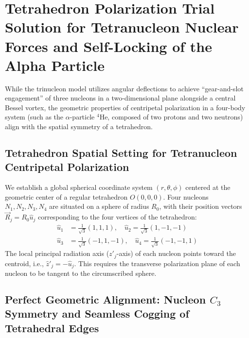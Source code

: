 \documentclass[12pt, a4paper]{article}
\begin{document}
\section{Tetrahedron Polarization Trial Solution for Tetranucleon Nuclear Forces and Self-Locking of the Alpha Particle}

While the trinucleon model utilizes angular deflections to achieve ``gear-and-slot engagement'' of three nucleons in a two-dimensional plane alongside a central Bessel vortex, the geometric properties of centripetal polarization in a four-body system (such as the $\alpha$-particle ${}^4\text{He}$, composed of two protons and two neutrons) align with the spatial symmetry of a tetrahedron.

\subsection{Tetrahedron Spatial Setting for Tetranucleon Centripetal Polarization}

We establish a global spherical coordinate system $(r, \theta, \phi)$ centered at the geometric center of a regular tetrahedron $O(0,0,0)$. Four nucleons $N_1, N_2, N_3, N_4$ are situated on a sphere of radius $R_0$, with their position vectors $\vec{R}_j = R_0 \hat{u}_j$ corresponding to the four vertices of the tetrahedron:
\begin{align}
\hat{u}_1 &= \frac{1}{\sqrt{3}} (1, 1, 1), \quad \hat{u}_2 = \frac{1}{\sqrt{3}} (1, -1, -1) \\
\hat{u}_3 &= \frac{1}{\sqrt{3}} (-1, 1, -1), \quad \hat{u}_4 = \frac{1}{\sqrt{3}} (-1, -1, 1)
\end{align}
The local principal radiation axis ($z'_j$-axis) of each nucleon points toward the centroid, i.e., $\hat{z}'_j = -\hat{u}_j$. This requires the transverse polarization plane of each nucleon to be tangent to the circumscribed sphere.

\subsection{Perfect Geometric Alignment: Nucleon $C_3$ Symmetry and Seamless Cogging of Tetrahedral Edges}
\end{document}
